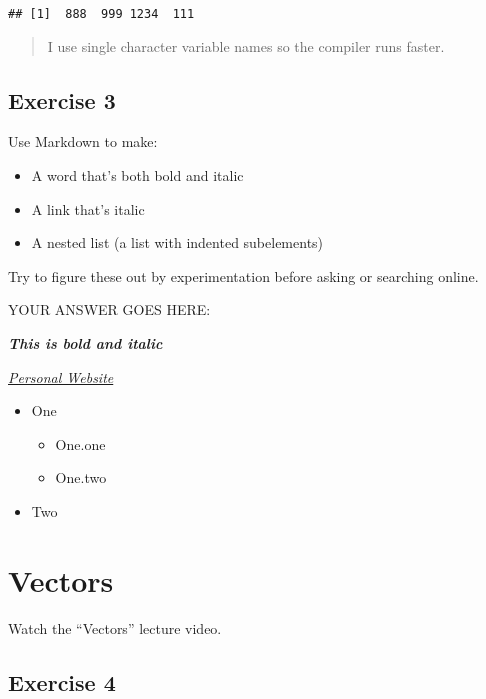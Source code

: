 \documentclass[
]{article}
\providecommand{\tightlist}{%
  \setlength{\itemsep}{0pt}\setlength{\parskip}{0pt}}
\begin{document}
\begin{verbatim}
## [1]  888  999 1234  111
\end{verbatim}

\begin{quote}
I use single character variable names so the compiler runs faster.
\end{quote}

\hypertarget{exercise-3}{%
\subsection{Exercise 3}\label{exercise-3}}

Use Markdown to make:

\begin{itemize}
\tightlist
\item
  A word that's both bold and italic
\item
  A link that's italic
\item
  A nested list (a list with indented subelements)
\end{itemize}

Try to figure these out by experimentation before asking or searching
online.

YOUR ANSWER GOES HERE:

\textbf{\emph{This is bold and italic}}

\emph{\href{http://mingyfong.github.io/}{Personal Website}}

\begin{itemize}
\tightlist
\item
  One

  \begin{itemize}
  \tightlist
  \item
    One.one
  \item
    One.two
  \end{itemize}
\item
  Two
\end{itemize}

\hypertarget{vectors}{%
\section{Vectors}\label{vectors}}

Watch the ``Vectors'' lecture video.

\hypertarget{exercise-4}{%
\subsection{Exercise 4}\label{exercise-4}}
\end{document}

